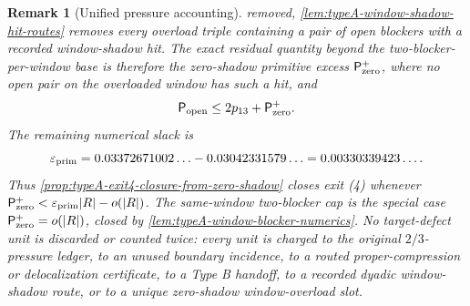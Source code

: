 \documentclass[11pt]{article}
\newtheorem{remark}[theorem]{Remark}
\begin{document}
\begin{remark}[Unified pressure accounting]
removed, \cref{lem:typeA-window-shadow-hit-routes} removes every overload
triple containing a pair of open blockers with a recorded window-shadow hit.
The exact residual quantity beyond the two-blocker-per-window base is therefore
the zero-shadow primitive excess \(\mathsf P_{\rm zero}^{+}\), where no open
pair on the overloaded window has such a hit, and
\[
\mathsf P_{\rm open}\le2p_{13}+\mathsf P_{\rm zero}^{+}.
\]
The remaining numerical slack is
\[
\varepsilon_{\rm prim}
=
0.03372671002\ldots-0.03042331579\ldots
=0.00330339423\ldots .
\]
Thus \cref{prop:typeA-exit4-closure-from-zero-shadow} closes exit
\textup{(4)} whenever
\(\mathsf P_{\rm zero}^{+}<\varepsilon_{\rm prim}|R|-o(|R|)\).  The
same-window two-blocker cap is the special case
\(\mathsf P_{\rm zero}^{+}=o(|R|)\), closed by
\cref{lem:typeA-window-blocker-numerics}.  No target-defect unit is discarded
or counted twice: every unit is charged to the original \(2/3\)-pressure
ledger, to an unused boundary incidence, to a routed proper-compression or
delocalization certificate, to a Type B handoff, to a recorded dyadic
window-shadow route, or to a unique zero-shadow window-overload slot.
\end{remark}
\end{document}
